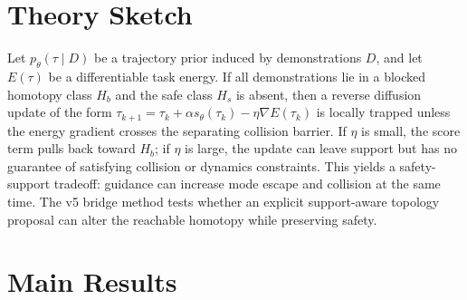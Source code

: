 \documentclass{article}
\begin{document}
\section{Theory Sketch}
Let $p_\theta(\tau\mid D)$ be a trajectory prior induced by demonstrations $D$, and let $E(\tau)$ be a differentiable task energy. If all demonstrations lie in a blocked homotopy class $H_b$ and the safe class $H_s$ is absent, then a reverse diffusion update of the form $\tau_{k+1}=\tau_k+\alpha s_\theta(\tau_k)-\eta\nabla E(\tau_k)$ is locally trapped unless the energy gradient crosses the separating collision barrier. If $\eta$ is small, the score term pulls back toward $H_b$; if $\eta$ is large, the update can leave support but has no guarantee of satisfying collision or dynamics constraints. This yields a safety-support tradeoff: guidance can increase mode escape and collision at the same time. The v5 bridge method tests whether an explicit support-aware topology proposal can alter the reachable homotopy while preserving safety.

\section{Main Results}
\begin{table}[tbp]
\centering
\scriptsize
\setlength{\tabcolsep}{3.2pt}
\caption{Decisive off-support corridor}
\end{table}
\end{document}
